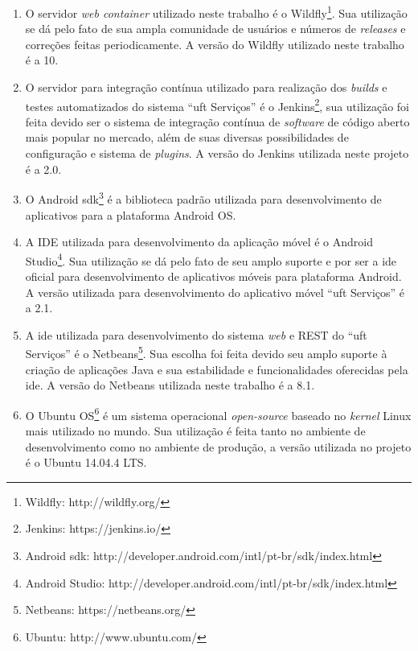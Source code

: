 \begin{enumerate}
    \item O servidor \textit{web container} utilizado neste trabalho é o Wildfly\footnote{Wildfly: http://wildfly.org/}. Sua utilização se dá pelo fato de sua ampla comunidade de usuários e números de \textit{releases} e correções feitas periodicamente. A versão do Wildfly utilizado neste trabalho é a 10.
    
    \item O servidor para integração contínua utilizado para realização dos \textit{builds} e testes automatizados do sistema ``\acrshort{uft} Serviços'' é o Jenkins\footnote{Jenkins: https://jenkins.io/}, sua utilização foi feita devido ser o sistema de integração contínua de \textit{software} de código aberto mais popular no mercado, além de suas diversas possibilidades de configuração e sistema de \textit{plugins}. A versão do Jenkins utilizada neste projeto é a 2.0.
    
    \item O Android \acrshort{sdk}\footnote{Android \acrshort{sdk}: http://developer.android.com/intl/pt-br/sdk/index.html} é a biblioteca padrão utilizada para desenvolvimento de aplicativos para a plataforma Android OS.
    
    \item A IDE utilizada para desenvolvimento da aplicação móvel é o Android Studio\footnote{Android Studio: http://developer.android.com/intl/pt-br/sdk/index.html}. Sua utilização se dá pelo fato de seu amplo suporte e por ser a \acrshort{ide} oficial para desenvolvimento de aplicativos móveis para plataforma Android. A versão utilizada para desenvolvimento do aplicativo móvel ``\acrshort{uft} Serviços'' é a 2.1.
    
    \item A \acrshort{ide} utilizada para desenvolvimento do sistema \textit{web} e REST do ``\acrshort{uft} Serviços'' é o Netbeans\footnote{Netbeans: https://netbeans.org/}. Sua escolha foi feita devido seu amplo suporte à criação de aplicações Java e sua estabilidade e funcionalidades oferecidas pela \acrshort{ide}. A versão do Netbeans utilizada neste trabalho é a 8.1.
    
    \item O Ubuntu OS\footnote{Ubuntu: http://www.ubuntu.com/} é um sistema operacional \textit{open-source} baseado no \textit{kernel} Linux mais utilizado no mundo. Sua utilização é feita tanto no ambiente de desenvolvimento como no ambiente de produção, a versão utilizada no projeto é o Ubuntu 14.04.4 LTS.
    

\end{enumerate}
